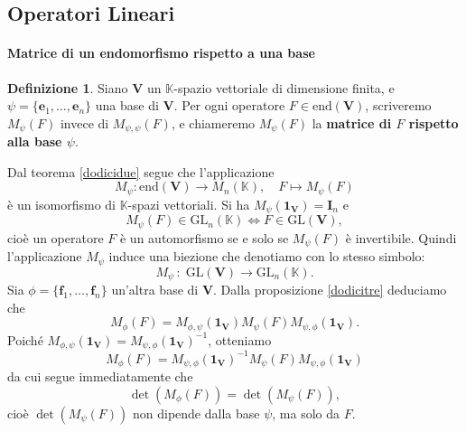 \documentclass{article}
\theoremstyle{plain}
\theoremstyle{definition}
\newtheorem{defn}{Definizione}[section]
\theoremstyle{remark}
\begin{document}
\newpage
\subsection{Operatori Lineari}
\vspace{20pt}

\paragraph{Matrice di un endomorfismo rispetto a una base}
\begin{bxthm}
\begin{defn}
Siano \( \mathbf{V} \) un \( \mathbb{K} \)-spazio vettoriale di dimensione finita, e \( \psi = \{\mathbf{e}_1, \ldots, \mathbf{e}_n\} \) una base di \( \mathbf{V} \). 
Per ogni operatore \( F \in \mathrm{end}(\mathbf{V}) \), scriveremo \( M_\psi(F) \) invece di \( M_{\psi,\psi}(F) \), e chiameremo 
\( M_\psi(F) \) la \textbf{matrice di \( F \) rispetto alla base \( \psi \)}.    
\end{defn}
\end{bxthm}

\vspace{10pt}

Dal teorema \ref{dodicidue} segue che l'applicazione
\[M_\psi \colon \mathrm{end}(\mathbf{V}) \to M_n(\mathbb{K}),\quad F \mapsto M_\psi(F)\]
è un isomorfismo di \( \mathbb{K} \)-spazi vettoriali. Si ha $M_\psi(\mathbf{1_V}) = \mathbf{I}_n$ e 
\[ M_\psi(F) \in \mathrm{GL}_n(\mathbb{K})\iff F \in \mathrm{GL}(\mathbf{V}),\]
cioè un operatore \( F \) è un automorfismo se e solo se \( M_\psi(F) \) è invertibile. 
Quindi l'applicazione \( M_\psi \) induce una biezione che denotiamo con lo stesso simbolo:
\[
M_\psi \,:\; \mathrm{GL}(\mathbf{V}) \to \mathrm{GL}_n(\mathbb{K}).
\]
Sia \( \phi = \{\mathbf{f}_1, \ldots, \mathbf{f}_n\} \) un'altra base di \( \mathbf{V} \). 
Dalla proposizione \ref{dodicitre} deduciamo che
\[
M_\phi(F) = M_{\phi,\psi}(\mathbf{1_V}) M_\psi(F) M_{\psi,\phi}(\mathbf{1_V}).
\]
Poiché \( M_{\phi,\psi}(\mathbf{1_V}) = M_{\psi,\phi}(\mathbf{1_V})^{-1} \), otteniamo
\begin{equation}\label{trediciuno}
M_\phi(F) = M_{\psi,\phi}(\mathbf{1_V})^{-1} M_\psi(F) M_{\psi,\phi}(\mathbf{1_V})     
\end{equation}
da cui segue immediatamente che
\[
\det(M_\phi(F)) = \det(M_\psi(F)),
\]
cioè \( \det(M_\psi(F)) \) non dipende dalla base \( \psi \), ma solo da \( F \). 

\vspace{10pt}
\end{document}
